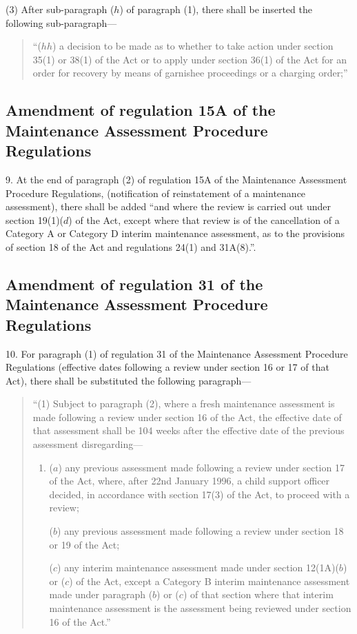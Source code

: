 \documentclass[12pt,a4paper]{article}
\begin{document}
(3) After sub-paragraph ($h$) of paragraph (1), there shall be inserted the following sub-paragraph—
\begin{quotation}
“($hh$) a decision to be made as to whether to take action under section 35(1) or 38(1) of the Act or to apply under section 36(1) of the Act for an order for recovery by means of garnishee proceedings or a charging order;”
\end{quotation}

\subsection[9. Amendment of regulation 15A of the Maintenance Assessment Procedure Regulations]{Amendment of regulation 15A of the Maintenance Assessment Procedure Regulations}

9.  At the end of paragraph (2) of regulation 15A of the Maintenance Assessment Procedure Regulations, (notification of reinstatement of a maintenance assessment), there shall be added “and where the review is carried out under section 19(1)($d$) of the Act, except where that review is of the cancellation of a Category A or Category D interim maintenance assessment, as to the provisions of section 18 of the Act and regulations 24(1) and 31A(8).”.

\subsection[10. Amendment of regulation 31 of the Maintenance Assessment Procedure Regulations]{Amendment of regulation 31 of the Maintenance Assessment Procedure Regulations}

10.  For paragraph (1) of regulation 31 of the Maintenance Assessment Procedure Regulations (effective dates following a review under section 16 or 17 of that Act), there shall be substituted the following paragraph—
\begin{quotation}
“(1) Subject to paragraph (2), where a fresh maintenance assessment is made following a review under section 16 of the Act, the effective date of that assessment shall be 104 weeks after the effective date of the previous assessment disregarding—
\begin{enumerate}\item[]
($a$) any previous assessment made following a review under section 17 of the Act, where, after 22nd January 1996, a child support officer decided, in accordance with section 17(3) of the Act, to proceed with a review;

($b$) any previous assessment made following a review under section 18 or 19 of the Act;

($c$) any interim maintenance assessment made under section 12(1A)($b$) or ($c$) of the Act, except a Category B interim maintenance assessment made under paragraph ($b$) or ($c$) of that section where that interim maintenance assessment is the assessment being reviewed under section 16 of the Act.”
\end{enumerate}
\end{quotation}
\end{document}
